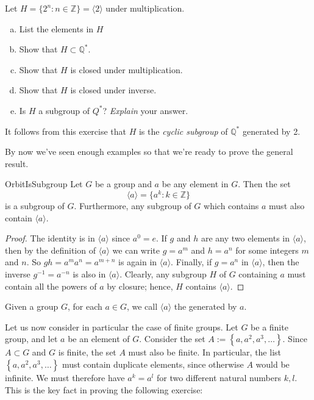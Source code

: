 \begin{exercise}{87}
Let $H = \{ 2^n : n \in {\mathbb Z} \} = \langle 2 \rangle$ under multiplication.
\begin{enumerate}[(a)]
\item
List the elements in $H$
\item
Show that $H \subset {\mathbb Q}^*$.
\item
Show that $H$ is closed under multiplication.
\item
Show that $H$ is closed under inverse.
\item
Is $H$ a subgroup of $Q^*$? \emph{Explain} your answer.
\end{enumerate}
\end{exercise}
It follows from this exercise that   $H$ is the \emph{cyclic subgroup} of ${\mathbb Q}^*$ generated by 2.   

By now we've seen enough examples so that we're ready to prove the general result.

\begin{prop}{OrbitIsSubgroup}
Let $G$ be a group and $a$ be any element in $G$.  Then the set
\[
\langle a \rangle  = \{ a^k : k \in {\mathbb Z} \}\label{generatedby}
\]
is a subgroup of $G$.  Furthermore, any subgroup of $G$ which contains $a$ must also contain $\langle a \rangle$. 
\end{prop}
 
 \begin{proof}
The identity is in $\langle a \rangle $ since $a^0 = e$. If $g$ and
$h$ are any two elements in $\langle a \rangle $, then by the
definition of $\langle a \rangle$ we can write $g = a^m$ and $h = a^n$
for some integers $m$ and $n$. So $gh = a^m a^n = a^{m+n}$ is again in
$\langle a \rangle $. Finally, if $g = a^n$ in $\langle a \rangle $,
then the inverse $g^{-1} = a^{-n}$ is also in $\langle a \rangle $.
Clearly, any subgroup $H$ of $G$ containing $a$ must contain all the
powers of $a$ by closure; hence, $H$ contains $\langle a \rangle $.
\end{proof}
 
\medskip
\begin{defn}\label{defn_cyclic_subgroup}
Given a group $G$, for each $a \in G$, we call $\langle a \rangle $ the  generated by $a$. 
\end{defn}
 
Let us now consider in particular the case of finite groups. Let $G$ be a finite group, and let $a$ be an element of $G$. Consider the set $A :=\left\{a, a^2, a^3, \ldots \right\}$. Since $A \subset G$ and $G$ is finite, the set $A$ must also be finite. In particular, the list 
$\left\{a, a^2, a^3, \ldots\right\}$ must contain duplicate elements, since otherwise $A$ would be infinite. We must therefore have $a^k = a^l$ for two different natural numbers $k,l$. This is the key fact in proving the following exercise:

